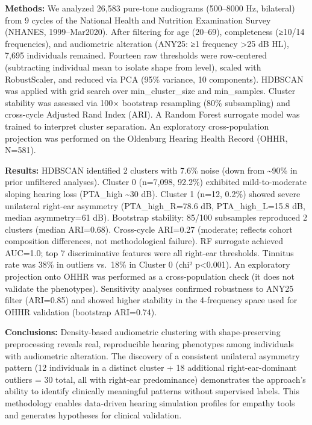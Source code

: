 \documentclass[
]{article}
\begin{document}
\textbf{Methods:} We analyzed 26,583 pure-tone audiograms (500--8000 Hz,
bilateral) from 9 cycles of the National Health and Nutrition Examination Survey
(NHANES, 1999--Mar2020). After filtering for age (20--69), completeness (≥10/14
frequencies), and audiometric alteration (ANY25: ≥1 frequency \textgreater25 dB
HL), 7,695 individuals remained. Fourteen raw thresholds were row-centered
(subtracting individual mean to isolate shape from level), scaled with
RobustScaler, and reduced via PCA (95\% variance, 10 components). HDBSCAN was
applied with grid search over min\_cluster\_size and min\_samples. Cluster
stability was assessed via 100× bootstrap resampling (80\% subsampling) and
cross-cycle Adjusted Rand Index (ARI). A Random Forest surrogate model was
trained to interpret cluster separation. An exploratory cross-population projection was performed on
the Oldenburg Hearing Health Record (OHHR, N=581).

\textbf{Results:} HDBSCAN identified 2 clusters with 7.6\% noise (down from
\textasciitilde90\% in prior unfiltered analyses). Cluster 0 (n=7,098, 92.2\%)
exhibited mild-to-moderate sloping hearing loss (PTA\_high \textasciitilde30
dB). Cluster 1 (n=12, 0.2\%) showed severe unilateral right-ear asymmetry
(PTA\_high\_R=78.6 dB, PTA\_high\_L=15.8 dB, median asymmetry=61 dB). Bootstrap
stability: 85/100 subsamples reproduced 2 clusters (median ARI=0.68).
Cross-cycle ARI=0.27 (moderate; reflects cohort composition differences, not
methodological failure). RF surrogate achieved AUC=1.0; top 7 discriminative
features were all right-ear thresholds. Tinnitus rate was 38\% in outliers
vs.~18\% in Cluster 0 (chi² p\textless0.001). An exploratory projection onto OHHR
was performed as a cross-population check (it does not validate the phenotypes). Sensitivity analyses
confirmed robustness to ANY25 filter (ARI=0.85) and showed higher stability in
the 4-frequency space used for OHHR validation (bootstrap ARI=0.74).

\textbf{Conclusions:} Density-based audiometric clustering with shape-preserving
preprocessing reveals real, reproducible hearing phenotypes among individuals
with audiometric alteration. The discovery of a consistent unilateral asymmetry
pattern (12 individuals in a distinct cluster + 18 additional right-ear-dominant
outliers = 30 total, all with right-ear predominance) demonstrates the
approach's ability to identify clinically meaningful patterns without supervised
labels. This methodology enables data-driven hearing simulation profiles for
empathy tools and generates hypotheses for clinical validation.
\end{document}
